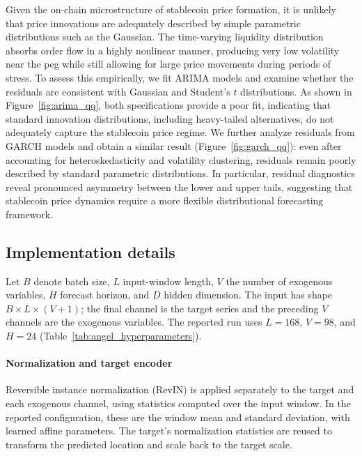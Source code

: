 \documentclass[a4paper,fleqn]{cas-sc}
\begin{document}
Given the on-chain microstructure of stablecoin price formation, it is unlikely that price innovations are adequately described by simple parametric distributions such as the Gaussian. The time-varying liquidity distribution absorbs order flow in a highly nonlinear manner, producing very low volatility near the peg while still allowing for large price movements during periods of stress. To assess this empirically, we fit ARIMA models and examine whether the residuals are consistent with Gaussian and Student's $t$ distributions. As shown in Figure~\ref{fig:arima_qq}, both specifications provide a poor fit, indicating that standard innovation distributions, including heavy-tailed alternatives, do not adequately capture the stablecoin price regime. We further analyze residuals from GARCH models and obtain a similar result (Figure~\ref{fig:garch_qq}): even after accounting for heteroskedasticity and volatility clustering, residuals remain poorly described by standard parametric distributions. In particular, residual diagnostics reveal pronounced asymmetry between the lower and upper tails, suggesting that stablecoin price dynamics require a more flexible distributional forecasting framework.


\subsection{Implementation details}
\label{sec:hyperparameters}

Let $B$ denote batch size, $L$ input-window length, $V$ the number of
exogenous variables, $H$ forecast horizon, and $D$ hidden dimension. The
input has shape $B\times L\times(V+1)$; the final channel is the target
series and the preceding $V$ channels are the exogenous variables. The
reported run uses $L=168$, $V=98$, and $H=24$ (Table~\ref{tab:angel_hyperparameters}).

\paragraph{Normalization and target encoder}
Reversible instance normalization (RevIN) is applied separately to the
target and each exogenous channel, using statistics computed over the input
window. In the reported configuration, these are the window mean and
standard deviation, with learned affine parameters. The target's
normalization statistics are reused to transform the predicted location and
scale back to the target scale.
\end{document}
